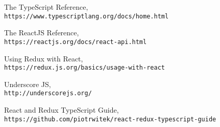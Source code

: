\documentclass[rel_mlp]{iiufrgs}
\begin{document}
\begin{thebibliography}{9}
The TypeScript Reference,
\\\texttt{https://www.typescriptlang.org/docs/home.html}

The ReactJS Reference,
\\\texttt{https://reactjs.org/docs/react-api.html}


Using Redux with React,
\\\texttt{https://redux.js.org/basics/usage-with-react}

Underscore JS,
\\\texttt{http://underscorejs.org/}

React and Redux TypeScript Guide,
\\\texttt{https://github.com/piotrwitek/react-redux-typescript-guide}

\end{thebibliography}
\end{document}
